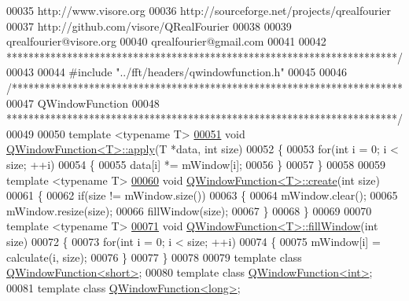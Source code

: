 \begin{DoxyCode}
00035 \textcolor{comment}{http://www.visore.org}
00036 \textcolor{comment}{http://sourceforge.net/projects/qrealfourier}
00037 \textcolor{comment}{http://github.com/visore/QRealFourier}
00038 \textcolor{comment}{}
00039 \textcolor{comment}{qrealfourier@visore.org}
00040 \textcolor{comment}{qrealfourier@gmail.com}
00041 \textcolor{comment}{}
00042 \textcolor{comment}{***********************************************************************/}
00043 
00044 \textcolor{preprocessor}{#include "../fft/headers/qwindowfunction.h"}
00045 
00046 \textcolor{comment}{/***********************************************************************}
00047 \textcolor{comment}{QWindowFunction}
00048 \textcolor{comment}{***********************************************************************/}
00049 
00050 \textcolor{keyword}{template} <\textcolor{keyword}{typename} T>
\hypertarget{a00127_source_l00051}{}\hyperlink{a00071_aa4a4f988e1f4b65e4181a0c8c3245a00}{00051} \textcolor{keywordtype}{void} \hyperlink{a00071_aa4a4f988e1f4b65e4181a0c8c3245a00}{QWindowFunction<T>::apply}(T *data, \textcolor{keywordtype}{int} size)
00052 \{
00053     \textcolor{keywordflow}{for}(\textcolor{keywordtype}{int} i = 0; i < size; ++i)
00054     \{
00055         data[i] *= mWindow[i];
00056     \}
00057 \}
00058 
00059 \textcolor{keyword}{template} <\textcolor{keyword}{typename} T>
\hypertarget{a00127_source_l00060}{}\hyperlink{a00071_a23ec85a35c762367195a47898cc75380}{00060} \textcolor{keywordtype}{void} \hyperlink{a00071_a23ec85a35c762367195a47898cc75380}{QWindowFunction<T>::create}(\textcolor{keywordtype}{int} size)
00061 \{
00062     \textcolor{keywordflow}{if}(size != mWindow.size())
00063     \{
00064         mWindow.clear();
00065         mWindow.resize(size);
00066         fillWindow(size);
00067     \}
00068 \}
00069 
00070 \textcolor{keyword}{template} <\textcolor{keyword}{typename} T>
\hypertarget{a00127_source_l00071}{}\hyperlink{a00071_abde81294328ded8482380a7cfefab0b9}{00071} \textcolor{keywordtype}{void} \hyperlink{a00071_abde81294328ded8482380a7cfefab0b9}{QWindowFunction<T>::fillWindow}(\textcolor{keywordtype}{int} size)
00072 \{
00073     \textcolor{keywordflow}{for}(\textcolor{keywordtype}{int} i = 0; i < size; ++i)
00074     \{
00075         mWindow[i] = calculate(i, size);
00076     \}
00077 \}
00078 
00079 \textcolor{keyword}{template} \textcolor{keyword}{class }\hyperlink{a00071}{QWindowFunction<short>};
00080 \textcolor{keyword}{template} \textcolor{keyword}{class }\hyperlink{a00071}{QWindowFunction<int>};
00081 \textcolor{keyword}{template} \textcolor{keyword}{class }\hyperlink{a00071}{QWindowFunction<long>};

\end{DoxyCode}
